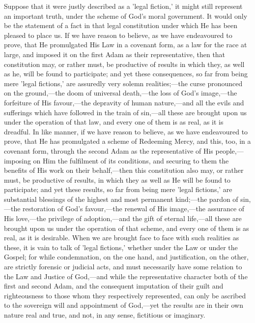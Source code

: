 \documentclass[
]{book}
\begin{document}
Suppose that it were justly described as a 'legal fiction,' it might still represent an important truth, under the scheme of God's moral government. It would only be the statement of a fact in that legal constitution under which He has been pleased to place us. If we have reason to believe, as we have endeavoured to prove, that He promulgated His Law in a covenant form, as a law for the race at large, and imposed it on the first Adam as their representative, then that constitution may, or rather must, be productive of results in which they, as well as he, will be found to participate; and yet these consequences, so far from being mere 'legal fictions,' are assuredly very solemn realities;---the curse pronounced on the ground,---the doom of universal death,---the loss of God's image,---the forfeiture of His favour,---the depravity of human nature,---and all the evils and sufferings which have followed in the train of sin,---all these are brought upon us under the operation of that law, and every one of them is as real, as it is dreadful. In like manner, if we have reason to believe, as we have endeavoured to prove, that He has promulgated a scheme of Redeeming Mercy, and this, too, in a covenant form, through the second Adam as the representative of His people,---imposing on Him the fulfilment of its conditions, and securing to them the benefits of His work on their behalf,---then this constitution also may, or rather must, be productive of results, in which they as well as He will be found to participate; and yet these results, so far from being mere 'legal fictions,' are substantial blessings of the highest and most permanent kind;---the pardon of sin,---the restoration of God's favour,---the renewal of His image,---the assurance of His love,---the privilege of adoption,---and the gift of eternal life,---all these are brought upon us under the operation of that scheme, and every one of them is as real, as it is desirable. When we are brought face to face with such realities as these, it is vain to talk of 'legal fictions,' whether under the Law or under the Gospel; for while condemnation, on the one hand, and justification, on the other, are strictly forensic or judicial acts, and must necessarily have some relation to the Law and Justice of God,---and while the representative character both of the first and second Adam, and the consequent imputation of their guilt and righteousness to those whom they respectively represented, can only be ascribed to the sovereign will and appointment of God,---yet the results are in their own nature real and true, and not, in any sense, fictitious or imaginary.
\end{document}
